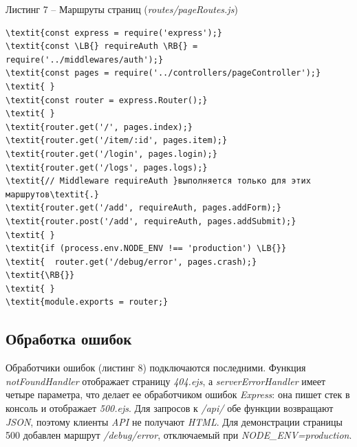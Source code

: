 \documentclass[14pt,a4paper]{extarticle}
\newcommand{\LB}{\char123}
\newcommand{\RB}{\char125}
\begin{document}
\noindent\vspace{18pt}\par\nopagebreak\noindent Листинг 7 – Маршруты страниц (\textit{routes/pageRoutes.js})\par\nopagebreak
\begin{Verbatim}[commandchars=\\\{\},fontsize=\small,baselinestretch=1]
\textit{const express = require('express');}
\textit{const \LB{} requireAuth \RB{} = require('../middlewares/auth');}
\textit{const pages = require('../controllers/pageController');}
\textit{ }
\textit{const router = express.Router();}
\textit{ }
\textit{router.get('/', pages.index);}
\textit{router.get('/item/:id', pages.item);}
\textit{router.get('/login', pages.login);}
\textit{router.get('/logs', pages.logs);}
\textit{// Middleware requireAuth }выполняется только для этих маршрутов\textit{.}
\textit{router.get('/add', requireAuth, pages.addForm);}
\textit{router.post('/add', requireAuth, pages.addSubmit);}
\textit{ }
\textit{if (process.env.NODE_ENV !== 'production') \LB{}}
\textit{  router.get('/debug/error', pages.crash);}
\textit{\RB{}}
\textit{ }
\textit{module.exports = router;}
\end{Verbatim}
\vspace{18pt}

\subsection{Обработка ошибок}

Обработчики ошибок (листинг 8) подключаются последними. Функция \textit{notFoundHandler} отображает страницу \textit{404.ejs}, а \textit{serverErrorHandler} имеет четыре параметра, что делает ее обработчиком ошибок \textit{Express}: она пишет стек в консоль и отображает \textit{500.ejs}. Для запросов к \textit{/api/} обе функции возвращают \textit{JSON}, поэтому клиенты \textit{API} не получают \textit{HTML}. Для демонстрации страницы 500 добавлен маршрут \textit{/debug/error}, отключаемый при \textit{NODE\_ENV=production}.
\end{document}
